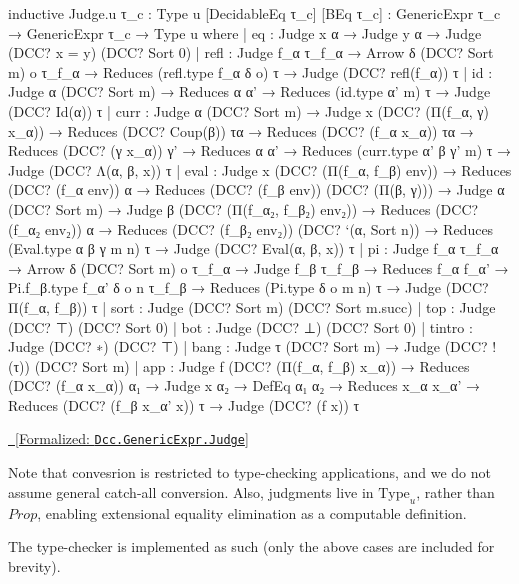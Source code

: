\documentclass{article}
\newcommand{\leanlink}[2]{
  \hfill \href{#1}{\textcolor{leanblue}\faCheckSquare~[Formalized: \texttt{#2}]}%
}
\newcommand{\type}[1]{\text{Type}_{#1}}
\begin{document}
\begin{leancode}
inductive Judge.{u} {τ_c : Type u} [DecidableEq τ_c] [BEq τ_c] : GenericExpr τ_c → GenericExpr τ_c → Type u where
  | eq     : Judge x α
    → Judge y α
    → Judge (DCC? x = y) (DCC? Sort 0)
  | refl    : Judge f_α τ_f_α
    → Arrow δ (DCC? Sort m) o τ_f_α
    → Reduces (refl.type f_α δ o) τ
    → Judge (DCC? refl(f_α)) τ
  | id     : Judge α (DCC? Sort m)
    → Reduces α α'
    → Reduces (id.type α' m) τ
    → Judge (DCC? Id(α)) τ
  | curr   : Judge α (DCC? Sort m)
    → Judge x (DCC? (Π(f_α, γ) x_α))
    → Reduces (DCC? Coup(β)) τα
    → Reduces (DCC? (f_α x_α)) τα
    → Reduces (DCC? (γ x_α)) γ'
    → Reduces α α'
    → Reduces (curr.type α' β γ' m) τ
    → Judge (DCC? Λ(α, β, x)) τ
  | eval   : Judge x (DCC? (Π(f_α, f_β) env))
    → Reduces (DCC? (f_α env)) α
    → Reduces (DCC? (f_β env)) (DCC? (Π(β, γ)))
    → Judge α (DCC? Sort m)
    → Judge β (DCC? (Π(f_α₂, f_β₂) env₂))
    → Reduces (DCC? (f_α₂ env₂)) α
    → Reduces (DCC? (f_β₂ env₂)) (DCC? `(α, Sort n))
    → Reduces (Eval.type α β γ m n) τ
    → Judge (DCC? Eval(α, β, x)) τ
  | pi     : Judge f_α τ_f_α
    → Arrow δ (DCC? Sort m) o τ_f_α
    → Judge f_β τ_f_β
    → Reduces f_α f_α'
    → Pi.f_β.type f_α' δ o n τ_f_β
    → Reduces (Pi.type δ o m n) τ
    → Judge (DCC? Π(f_α, f_β)) τ
  | sort   : Judge (DCC? Sort m) (DCC? Sort m.succ)
  | top    : Judge (DCC? ⊤) (DCC? Sort 0)
  | bot    : Judge (DCC? ⊥) (DCC? Sort 0)
  | tintro : Judge (DCC? ∗) (DCC? ⊤)
  | bang   : Judge τ (DCC? Sort m) → Judge (DCC? !(τ)) (DCC? Sort m)
  | app    : Judge f (DCC? (Π(f_α, f_β) x_α))
    → Reduces (DCC? (f_α x_α)) α₁
    → Judge x α₂
    → DefEq α₁ α₂
    → Reduces x_α x_α'
    → Reduces (DCC? (f_β x_α' x)) τ
    → Judge (DCC? (f x)) τ
\end{leancode}
\noindent \hfill\leanlink{https://github.com/lexzaiello/DCC/blob/891ac3750b8ed6d7ef7de14e01d4df5d8ed59129/Dcc/Judge3.lean\#L212}{Dcc.GenericExpr.Judge}

Note that convesrion is restricted to type-checking applications, and we do not assume general catch-all conversion. Also, judgments live in \(\type{u}\), rather than \(Prop\), enabling extensional equality elimination as a computable definition.

The type-checker is implemented as such (only the above cases are included for brevity).
\end{document}
